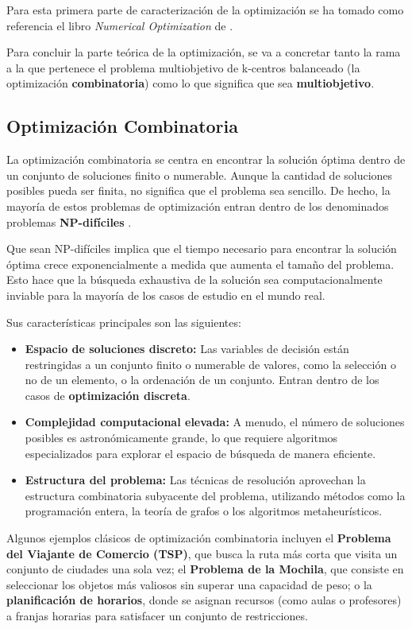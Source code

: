 \documentclass[12pt,a4paper]{book}
\begin{document}
Para esta primera parte de caracterización de la optimización se ha tomado como referencia el libro \textit{Numerical Optimization} de \cite{Numerical_optimization_nocedal_wright}. 

Para concluir la parte teórica de la optimización, se va a concretar tanto la rama a la que pertenece el problema multiobjetivo de k-centros balanceado (la optimización \textbf{combinatoria}) como lo que significa que sea \textbf{multiobjetivo}.

\subsection{Optimización Combinatoria}
La optimización combinatoria se centra en encontrar la solución óptima dentro de un conjunto de soluciones finito o numerable. Aunque la cantidad de soluciones posibles pueda ser finita, no significa que el problema sea sencillo.
De hecho, la mayoría de estos problemas de optimización entran dentro de los denominados problemas \textbf{NP-difíciles} \citep{np_hard}.

Que sean NP-difíciles implica que el tiempo necesario para encontrar la solución óptima crece exponencialmente a medida que aumenta el tamaño del problema. Esto hace que la búsqueda exhaustiva de la solución sea computacionalmente inviable para la mayoría de los casos de estudio en el mundo real.

Sus características principales son las siguientes:
\begin{itemize}
    \item \textbf{Espacio de soluciones discreto:} Las variables de decisión están restringidas a un conjunto finito o numerable de valores, como la selección o no de un elemento, o la ordenación de un conjunto. Entran dentro de los casos de \textbf{optimización discreta}. 
    \item \textbf{Complejidad computacional elevada:} A menudo, el número de soluciones posibles es astronómicamente grande, lo que requiere algoritmos especializados para explorar el espacio de búsqueda de manera eficiente.
    \item \textbf{Estructura del problema:} Las técnicas de resolución aprovechan la estructura combinatoria subyacente del problema, utilizando métodos como la programación entera, la teoría de grafos o los algoritmos metaheurísticos.
\end{itemize}

Algunos ejemplos clásicos de optimización combinatoria incluyen el \textbf{Problema del Viajante de Comercio (TSP)}, 
que busca la ruta más corta que visita un conjunto de ciudades una sola vez;
el \textbf{Problema de la Mochila}, que consiste en seleccionar los objetos más valiosos sin superar una capacidad de peso;
o la \textbf{planificación de horarios}, donde se asignan recursos (como aulas o profesores) a franjas horarias para satisfacer un conjunto de restricciones.
\end{document}
